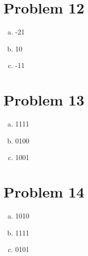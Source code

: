 \documentclass[11pt]{article}
\begin{document}
\section*{Problem 12}
\begin{enumerate}[(a)]
	\item -21
	\item 10
	\item -11
\end{enumerate}

\section*{Problem 13}
\begin{enumerate}[(a)]
	\item 1111
	\item 0100
	\item 1001
\end{enumerate}

\section*{Problem 14}
\begin{enumerate}[(a)]
	\item 1010
	\item 1111
	\item 0101
\end{enumerate}
\end{document}
